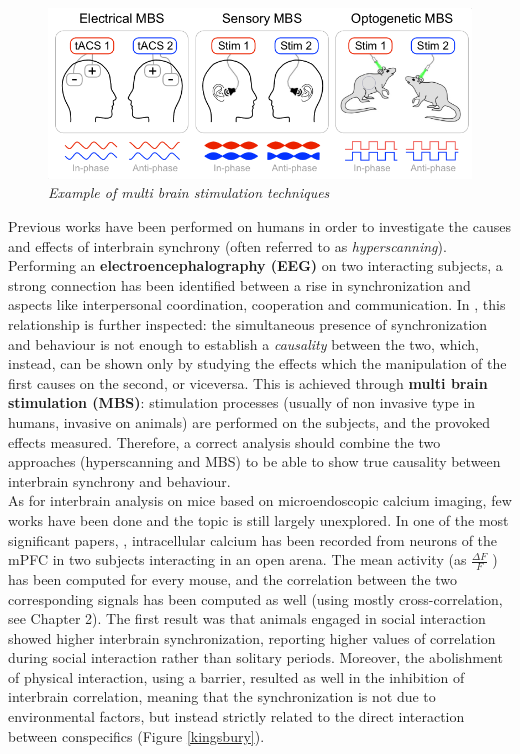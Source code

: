 \documentclass[12pt, a4paper]{report}
\begin{document}
\begin{figure}[H]
	\begin{center}
		\includegraphics[scale=.70]{novembre.png} 
	\end{center} 
	\caption{\textit{Example of multi brain stimulation techniques}} \label{mbs}
	
\end{figure}
Previous works \cite{14}%
 have been performed on humans in order to investigate the causes and effects of interbrain synchrony (often referred to as \textit{hyperscanning}). Performing an \textbf{electroencephalography (EEG)} on two interacting subjects, a strong connection has been identified between a rise in synchronization  and aspects like interpersonal coordination, cooperation and communication. In \cite{15}, %
 this relationship is further inspected: the simultaneous presence of synchronization and behaviour is not enough to establish a \textit{causality} between the two, which, instead, can be shown only by studying the effects which the manipulation of the first causes on the second, or viceversa. This is achieved through \textbf{multi brain stimulation (MBS)}: stimulation processes (usually of non invasive type in humans, invasive on animals) are performed on the subjects, and the provoked effects measured. Therefore, a correct analysis should combine the two approaches (hyperscanning and MBS) to be able to show true causality between interbrain synchrony and behaviour.
\\

As for interbrain analysis on mice based on microendoscopic calcium imaging, few works have been done and the topic is still largely unexplored. In one of the most significant papers, \cite{16}, %
 intracellular calcium has been recorded from neurons of the mPFC in two subjects interacting in an open arena.  The mean activity (as $\frac{\Delta F }{F}$ ) has been computed for every mouse, and the correlation between the two corresponding signals has been computed as well (using mostly cross-correlation, see Chapter 2). The first result was that animals engaged in social interaction showed higher interbrain synchronization, reporting higher values of correlation during social interaction rather than solitary periods. Moreover, the abolishment of physical interaction, using a barrier, resulted as well in the inhibition of interbrain correlation, meaning that the synchronization is not due to environmental factors, but instead strictly related to the direct interaction between conspecifics (Figure \ref{kingsbury}).\\
\end{document}
